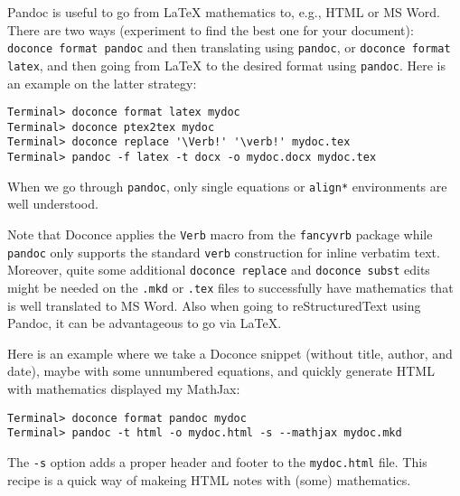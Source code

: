 \documentclass[%
oneside,                 %
final,                   %
10pt]{article}
\begin{document}
{{Pandoc is useful to go from {\LaTeX} mathematics to, e.g., HTML or MS Word.
There are two ways (experiment to find the best one for your document):
{\fontsize{10pt}{10pt}\Verb!doconce format pandoc!} and then translating using {\fontsize{10pt}{10pt}\Verb!pandoc!}, or
{\fontsize{10pt}{10pt}\Verb!doconce format latex!}, and then going from {\LaTeX} to the desired format
using {\fontsize{10pt}{10pt}\Verb!pandoc!}.
Here is an example on the latter strategy:
\vspace{4pt}
\begin{Verbatim}[numbers=none,frame=lines,label=\fbox{{\tiny Terminal}},fontsize=\fontsize{9pt}{9pt},
labelposition=topline,framesep=2.5mm,framerule=0.7pt]
Terminal> doconce format latex mydoc
Terminal> doconce ptex2tex mydoc
Terminal> doconce replace '\Verb!' '\verb!' mydoc.tex
Terminal> pandoc -f latex -t docx -o mydoc.docx mydoc.tex
\end{Verbatim}
When we go through {\fontsize{10pt}{10pt}\Verb!pandoc!}, only single equations or {\fontsize{10pt}{10pt}\Verb!align*!}
environments are well understood.

Note that Doconce applies the {\fontsize{10pt}{10pt}\Verb!Verb!} macro from the {\fontsize{10pt}{10pt}\Verb!fancyvrb!} package
while {\fontsize{10pt}{10pt}\Verb!pandoc!} only supports the standard {\fontsize{10pt}{10pt}\Verb!verb!} construction for
inline verbatim text.  Moreover, quite some additional {\fontsize{10pt}{10pt}\Verb!doconce replace!} and {\fontsize{10pt}{10pt}\Verb!doconce subst!} edits might be needed on the {\fontsize{10pt}{10pt}\Verb!.mkd!} or
{\fontsize{10pt}{10pt}\Verb!.tex!} files to successfully have mathematics that is well translated
to MS Word.  Also when going to reStructuredText using Pandoc, it can
be advantageous to go via {\LaTeX}.

Here is an example where we take a Doconce snippet (without title, author,
and date), maybe with some unnumbered equations, and quickly generate
HTML with mathematics displayed my MathJax:
\vspace{4pt}
\begin{Verbatim}[numbers=none,frame=lines,label=\fbox{{\tiny Terminal}},fontsize=\fontsize{9pt}{9pt},
labelposition=topline,framesep=2.5mm,framerule=0.7pt]
Terminal> doconce format pandoc mydoc
Terminal> pandoc -t html -o mydoc.html -s --mathjax mydoc.mkd
\end{Verbatim}
The {\fontsize{10pt}{10pt}\Verb!-s!} option adds a proper header and footer to the {\fontsize{10pt}{10pt}\Verb!mydoc.html!} file.
This recipe is a quick way of makeing HTML notes with (some) mathematics.

}}
\end{document}
